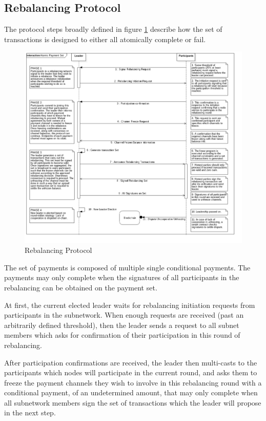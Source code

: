 \documentclass[12pt]{article}
\begin{document}
\subsection{Rebalancing Protocol}

The protocol steps broadly defined in figure \ref{protocol} describe how the set of transactions is designed to either all atomically complete or fail.

\begin{figure}[H]
\centering
\includegraphics[width=\textwidth]{protocol}
\caption{Rebalancing Protocol}
\label{protocol}
\end{figure}

The set of payments is composed of multiple single conditional payments. The payments may only complete when the signatures of all participants in the rebalancing can be obtained on the payment set.

At first, the current elected leader waits for rebalancing initiation requests from participants in the subnetwork. When enough requests are received (past an arbitrarily defined threshold), then the leader sends a request to all subnet members which asks for confirmation of their participation in this round of rebalancing.

After participation confirmations are received, the leader then multi-casts to the participants which nodes will participate in the current round, and asks them to freeze the payment channels they wish to involve in this rebalancing round with a conditional payment, of an undetermined amount, that may only complete when all subnetwork members sign the set of transactions which the leader will propose in the next step.
\end{document}
